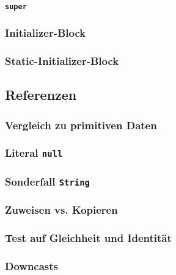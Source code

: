 		\paragraph{\texttt{super}}
	
	\subsubsection{Initializer-Block}
	
	\subsubsection{Static-Initializer-Block}

\subsection{Referenzen}
	
	\subsubsection{Vergleich zu primitiven Daten}
	
	\subsubsection{Literal \texttt{null}}
	
	\subsubsection{Sonderfall \texttt{String}}
	
	\subsubsection{Zuweisen vs. Kopieren}
	
	\subsubsection{Test auf Gleichheit und Identität}
	
	\subsubsection{Downcasts}

